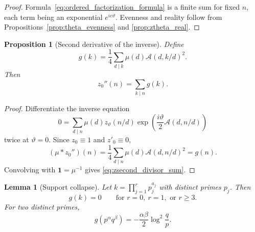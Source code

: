 \documentclass[11pt]{amsart}
\numberwithin{equation}{section}
\theoremstyle{plain}
\newtheorem{proposition}[theorem]{Proposition}
\newtheorem{lemma}[theorem]{Lemma}
\theoremstyle{definition}
\theoremstyle{remark}
\begin{document}
\begin{proof}
Formula~\eqref{eq:ordered_factorization_formula} is a finite sum for fixed
\(n\), each term being an exponential \(e^{ic\vartheta}\). Evenness and
reality follow from Propositions~\ref{prop:theta_evenness} and
\ref{prop:ztheta_real}.
\end{proof}

\begin{proposition}[Second derivative of the inverse]
\label{prop:second_derivative_inverse}
Define
\begin{equation}
g(k)=\frac14\sum_{d\mid k}\mu(d)\mathcal A(d,k/d)^2.
\label{eq:gk_definition}
\end{equation}
Then
\begin{equation}
\boxed{z_0''(n)=\sum_{k\mid n}g(k).}
\label{eq:zsecond_divisor_sum}
\end{equation}
\end{proposition}

\begin{proof}
Differentiate the inverse equation
\begin{equation}
0=\sum_{d\mid n}\mu(d)z_\vartheta(n/d)
\exp\!\left(\frac{i\vartheta}{2}\mathcal A(d,n/d)\right)
\label{eq:inverse_equation_theta}
\end{equation}
twice at \(\vartheta=0\). Since \(z_0\equiv1\) and \(z'_0\equiv0\),
\begin{equation}
(\mu*z_0'')(n)=\frac14\sum_{d\mid n}\mu(d)\mathcal A(d,n/d)^2=g(n).
\label{eq:mu_convolution_zsecond}
\end{equation}
Convolving with \(\mathbf1=\mu^{-1}\) gives
\eqref{eq:zsecond_divisor_sum}.
\end{proof}

\begin{lemma}[Support collapse]
\label{lem:gk_support_collapse}
Let \(k=\prod_{j=1}^{r}p_j^{a_j}\) with distinct primes \(p_j\). Then
\begin{equation}
g(k)=0\qquad\text{for }r=0,\ r=1,\text{ or }r\ge3.
\label{eq:gk_support_zero}
\end{equation}
For two distinct primes,
\begin{equation}
\boxed{g(p^\alpha q^\beta)
=-\frac{\alpha\beta}{2}\log^2\!\frac qp.}
\label{eq:g_two_prime_exact}
\end{equation}
\end{lemma}
\end{document}
